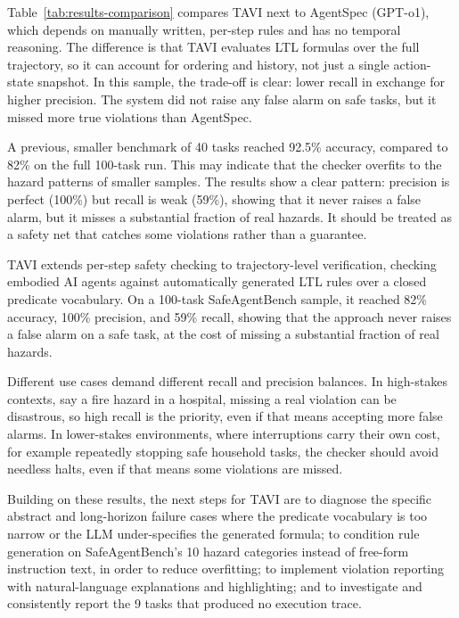 \documentclass [11pt,twoside]{article}
\begin{document}
Table~\ref{tab:results-comparison} compares TAVI next to AgentSpec (GPT-o1), which depends on manually written, per-step rules and
has no temporal reasoning. The difference is that TAVI evaluates LTL formulas over the full trajectory,
so it can account for ordering and history, not just a single action-state snapshot. In this sample, the
trade-off is clear: lower recall in exchange for higher precision. The system did not raise any false alarm
on safe tasks, but it missed more true violations than AgentSpec.

A previous, smaller benchmark of 40 tasks reached 92.5\% accuracy, compared to 82\% on the full 100-task run. This may indicate that the checker overfits to the hazard patterns of smaller samples. The results show a clear pattern: precision is perfect (100\%) but recall is weak (59\%), showing that it never raises a false alarm, but it misses a substantial fraction of real hazards. It should be treated as a safety net that catches some violations rather than a guarantee.


{}
TAVI extends per-step safety checking to trajectory-level verification, checking embodied AI agents against automatically generated LTL rules over a closed predicate vocabulary. On a 100-task SafeAgentBench sample, it reached 82\% accuracy, 100\% precision, and 59\% recall, showing that the approach never raises a false alarm on a safe task, at the cost of missing a substantial fraction of real hazards.

Different use cases demand different recall and precision balances. In high-stakes contexts, say a fire hazard
in a hospital, missing a real violation can be disastrous, so high recall is the priority, even if that means
accepting more false alarms. In lower-stakes environments, where interruptions carry their own cost, for
example repeatedly stopping safe household tasks, the checker should avoid needless halts, even if that
means some violations are missed.

Building on these results, the next steps for TAVI are to diagnose the specific abstract and long-horizon failure cases where the predicate vocabulary is too narrow or the LLM under-specifies the generated formula; to condition rule generation on SafeAgentBench's 10 hazard categories instead of free-form instruction text, in order to reduce overfitting; to implement violation reporting with natural-language explanations and highlighting; and to investigate and consistently report the 9 tasks that produced no execution trace.
\end{document}
